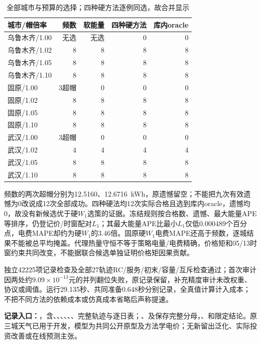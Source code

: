 \begin{table}[H]
\centering
\caption{全部城市与预算的选择；四种硬方法逐例同选，故合并显示}
\begin{tabularx}{\linewidth}{@{}Yrrrr@{}}
\toprule
城市/帽倍率 & 频数 & 软能量 & 四种硬方法 & 库内oracle\\\midrule
乌鲁木齐/1.00 & 无选 & 无选 & 0 & 0\\
乌鲁木齐/1.02 & 8 & 8 & 8 & 8\\
乌鲁木齐/1.05 & 8 & 8 & 8 & 8\\
乌鲁木齐/1.10 & 8 & 8 & 8 & 8\\
固原/1.00 & 3超帽 & 0 & 0 & 0\\
固原/1.02 & 8 & 8 & 8 & 8\\
固原/1.05 & 8 & 8 & 8 & 8\\
固原/1.10 & 8 & 8 & 8 & 8\\
武汉/1.00 & 3超帽 & 0 & 0 & 0\\
武汉/1.02 & 4 & 4 & 4 & 4\\
武汉/1.05 & 8 & 8 & 8 & 8\\
武汉/1.10 & 8 & 8 & 8 & 8\\
\bottomrule
\end{tabularx}
\end{table}

频数的两次超帽分别为12.5160、12.6716~kWh，原遗憾留空；不能把九次有效遗憾为0改说成12次全部成功。四种硬法均12次实际合格且选到库内oracle，遗憾均0，故没有新候选优于硬$W_1$选策的证据。冻结规则按合格数、遗憾、最大能量APE等排序，仍登记价/时窗配对$L_1$；其最大能量APE比最小$L_1$仅低0.000489个百分点，电费MAPE却约为硬$W_1$的3.46倍。固原硬$W_1$电费MAPE还高于频数，逐城结果不能被总平均掩盖。代理热量守恒不等于策略电量/电费精确，价格矩和05/13时窗约束共同改变，不能据联合候选单独证明价格矩因果贡献。

独立42225项记录检查及全部27轨迹RC/服务/初末/容量/互斥检查通过；首次审计因两处约$9.09\times10^{-13}$元的并列翻位失败，原记录保留，补充精度审计未改权重、协议或阈值。运行29.135秒、共同准备0.648秒分别记录，全真值计算计入成本；不把不同方法的依赖成本或仿真成本省略后声称提速。

\noindent\textbf{记录入口：}，含、、、、、、完整轨迹与逐日表；、及保存完整分母，、和限定结论。原三城天气已用于开发，模型为共同公开原型及方法学电价；无新留出泛化、实际投资改善或在线预测主张。

